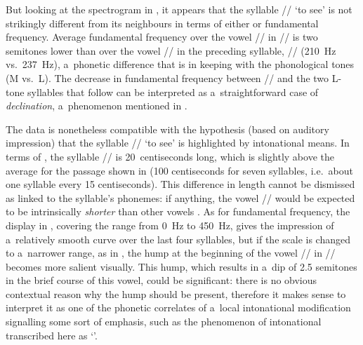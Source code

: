 But looking at the spectrogram in , it appears that the syllable // ‘to see’ is not strikingly different from its neighbours in terms of either  or fundamental frequency. Average fundamental frequency over the vowel // in // is two semitones lower than over the vowel // in the preceding syllable, // (210~Hz vs.\ 237~Hz), a~phonetic difference that is in keeping with the phonological tones (M vs.\ L). The decrease in fundamental frequency between // and the two L-tone syllables that follow can be interpreted as a~straightforward case of \textit{declination}, a~phenomenon mentioned in .  

The data is nonetheless compatible with the hypothesis (based on auditory impression) that the syllable // ‘to see’ is highlighted by intonational means. In terms of , the syllable // is 20~centiseconds long, which is slightly above the average for the passage shown in  (100 centiseconds for seven syllables, i.e.\ about one syllable every 15 centiseconds). This difference in length cannot be dismissed as linked to the syllable's phonemes: if anything, the vowel // would be expected to be intrinsically \textit{shorter} than other vowels \citep{dicristoetal1986, whalenetal1998}. As for fundamental frequency, the display in , covering the range from 0~Hz to 450~Hz, gives the impression of a~relatively smooth curve over the last four syllables, but if the scale is changed to a~narrower range, as in , the hump at the beginning of the vowel // in // becomes more salient visually. This hump, which results in a~dip of 2.5 semitones in the brief course of this vowel, could be significant: there is no obvious contextual reason why the hump should be present, therefore it makes sense to interpret it as one of the phonetic correlates of a~local intonational modification signalling some sort of emphasis, such as the phenomenon of intonational  transcribed here as ‘’.

